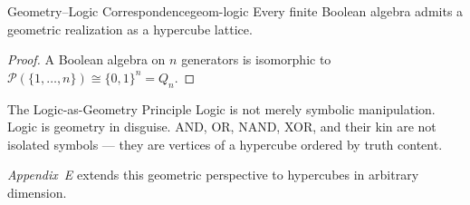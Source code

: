 \begin{theorem}{Geometry–Logic Correspondence}{geom-logic}
  Every finite Boolean algebra admits a geometric realization as a
  hypercube lattice.
\end{theorem}

\begin{proof}
  A Boolean algebra on $n$ generators is isomorphic to
  $\mathcal{P}(\{1,\ldots,n\}) \cong \{0,1\}^n = Q_n$.
\end{proof}

\begin{namedthm}{The Logic-as-Geometry Principle}
  Logic is not merely symbolic manipulation. Logic is geometry in disguise.
  AND, OR, NAND, XOR, and their kin are not isolated symbols — they are
  vertices of a hypercube ordered by truth content.
\end{namedthm}

\medskip
\textit{Appendix~E} extends this geometric perspective to hypercubes
in arbitrary dimension.
